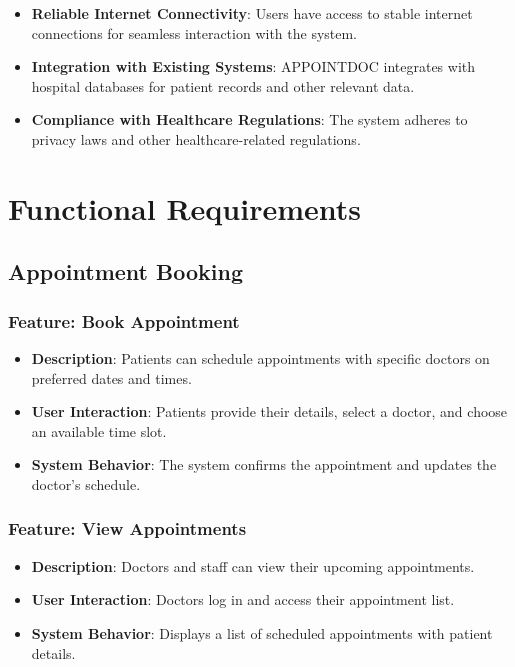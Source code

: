 \documentclass[a4paper, 12pt]{article}
\begin{document}
\begin{itemize}
    \item \textbf{Reliable Internet Connectivity}: Users have access to stable internet connections for seamless interaction with the system.
    \item \textbf{Integration with Existing Systems}: APPOINTDOC integrates with hospital databases for patient records and other relevant data.
    \item \textbf{Compliance with Healthcare Regulations}: The system adheres to privacy laws and other healthcare-related regulations.
\end{itemize}

\section{Functional Requirements}

\subsection{Appointment Booking}
\subsubsection{Feature: Book Appointment}
\begin{itemize}
    \item \textbf{Description}: Patients can schedule appointments with specific doctors on preferred dates and times.
    \item \textbf{User Interaction}: Patients provide their details, select a doctor, and choose an available time slot.
    \item \textbf{System Behavior}: The system confirms the appointment and updates the doctor's schedule.
\end{itemize}

\subsubsection{Feature: View Appointments}
\begin{itemize}
    \item \textbf{Description}: Doctors and staff can view their upcoming appointments.
    \item \textbf{User Interaction}: Doctors log in and access their appointment list.
    \item \textbf{System Behavior}: Displays a list of scheduled appointments with patient details.
\end{itemize}
\end{document}
